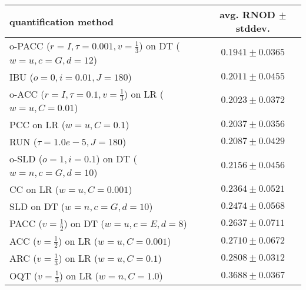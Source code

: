 \begin{tabular}{lc}
  \toprule
  quantification method & avg. RNOD $\pm$ stddev. \\
  \midrule
  o-PACC ($r=I, \tau=0.001, v=\frac{1}{3}$) on DT ($w=u, c=G, d=12$) & $\mathbf{0.1941 \pm 0.0365}$ \\
  IBU ($o=0, i=0.01, J=180$) & $0.2011 \pm 0.0455$ \\
  o-ACC ($r=I, \tau=0.1, v=\frac{1}{3}$) on LR ($w=u, C=0.01$) & $0.2023 \pm 0.0372$ \\
  PCC on LR ($w=u, C=0.1$) & $0.2037 \pm 0.0356$ \\
  RUN ($\tau=1.0e-5, J=180$) & $0.2087 \pm 0.0429$ \\
  o-SLD ($o=1, i=0.1$) on DT ($w=n, c=G, d=10$) & $0.2156 \pm 0.0456$ \\
  CC on LR ($w=u, C=0.001$) & $0.2364 \pm 0.0521$ \\
  SLD on DT ($w=n, c=G, d=10$) & $0.2474 \pm 0.0568$ \\
  PACC ($v=\frac{1}{2}$) on DT ($w=u, c=E, d=8$) & $0.2637 \pm 0.0711$ \\
  ACC ($v=\frac{1}{2}$) on LR ($w=u, C=0.001$) & $0.2710 \pm 0.0672$ \\
  ARC ($v=\frac{1}{3}$) on LR ($w=u, C=0.1$) & $0.2808 \pm 0.0312$ \\
  OQT ($v=\frac{1}{3}$) on LR ($w=n, C=1.0$) & $0.3688 \pm 0.0367$ \\
  \bottomrule
\end{tabular}
